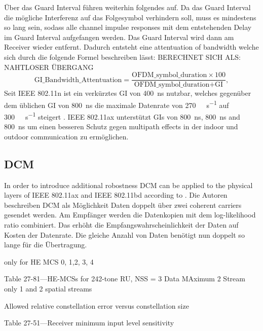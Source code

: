 Über das Guard Interval führen \textcite{pulimamidi_development_2007} weiterhin folgendes auf. 
Da das Guard Interval die mögliche Interferenz auf das Folgesymbol verhindern soll, muss es mindestens so lang sein, sodass alle channel impulse responses mit dem entstehenden Delay im Guard Interval aufgefangen werden. 
Das Guard Interval wird dann am Receiver wieder entfernt. Dadurch entsteht eine attentuation of bandwidth welche sich durch die folgende Formel beschreiben lässt: BERECHNET SICH ALS: NAHTLOSER ÜBERGANG 
\begin{equation}\label{eq:GI}
	\text{GI\_Bandwidth\_Attentuation} =
	\frac{
		\text{OFDM\_symbol\_duration} \times 100
	}{
		\text{OFDM\_symbol\_duration} + \text{GI}
	}
	,
\end{equation}
Seit IEEE 802.11n ist ein verkürztes \ac{GI} von  \SI{400}{\nano\second} nutzbar, welches gegenüber dem üblichen \ac{GI} von  \SI{800}{\nano\second} die  maximale Datenrate von \SI{270}{\mega\bit\per\second} auf \SI{300}{\mega\bit\per\second} steigert \cite{sauter_wireless_2022}.  IEEE 802.11ax unterstützt \ac{GI}s von \SI{800}{\nano\second}, \SI{800}{\nano\second} and \SI{800}{\nano\second} um einen besseren Schutz gegen  multipath effects in der indoor und outdoor communication zu ermöglichen. 
\subsection*{\acl{DCM}}
In order to introduce additional robostness \ac{DCM} can be applied to the physical layers of IEEE 802.11ax and IEEE 802.11bd according to \textcite{jacobs}. Die Autoren beschreiben \ac{DCM} als Möglichkeit Daten doppelt über zwei coherent carriers gesendet werden. Am Empfänger werden die Datenkopien mit dem log-likelihood ratio combiniert. Das erhöht die Empfangswahrscheinlichkeit der Daten auf Kosten der Datenrate. Die gleiche Anzahl von Daten benötigt nun doppelt so lange für die Übertragung. 



\cite{standard} only for HE MCS 0, 1,2, 3, 4


Table 27-81—HE-MCSs for 242-tone RU, NSS = 3
Data MAximum 2  Stream only 1 and 2 spatial streams

Allowed relative constellation error versus constellation size

Table 27-51—Receiver minimum input level sensitivity

